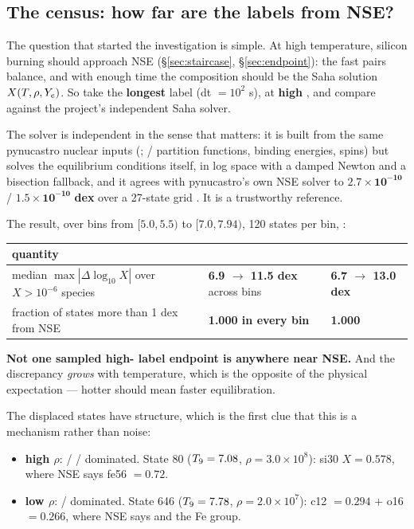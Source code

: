 \subsection{The census: how far are the labels from NSE?}
\label{sec:census}

The question that started the investigation is simple. At high temperature,
silicon burning should approach NSE (\S\ref{sec:staircase},
\S\ref{sec:endpoint}): the fast pairs balance, and with enough time the
composition should be the Saha solution $X(T, \rho, Y_{e})$. So take the
\textbf{longest} label (dt $= 10^{2}$ s), at \textbf{high} \Tn{}, and compare
against the project's independent Saha solver.

The solver is independent in the sense that matters: it is built from the same
pynucastro nuclear inputs (\citealt{smithclark2023}; \citealt{rauscher1997} /
\citealt{rauscher2003} partition functions, binding energies, spins) but solves
the equilibrium conditions itself, in log space with a damped Newton and a
bisection fallback, and it agrees with pynucastro's own NSE solver to
$\mathbf{2.7 \times 10^{-10}}$ / $\mathbf{1.5 \times 10^{-10}}$ \textbf{dex}
over a 27-state grid . It is a trustworthy reference.

The result, over \Tn{} bins from $[5.0, 5.5)$ to $[7.0, 7.94)$, 120 states per
bin, :

\begin{tabularx}{\textwidth}{@{}Y L{4.0cm} L{3.4cm}@{}}
\toprule
\textbf{quantity} & \textbf{} & \textbf{} \\
\midrule
median $\max|\Delta\log_{10}X|$ over $X > 10^{-6}$ species &
  \textbf{6.9 $\to$ 11.5 dex} across bins & \textbf{6.7 $\to$ 13.0 dex} \\
fraction of states more than 1 dex from NSE &
  \textbf{1.000 in every bin} & \textbf{1.000} \\
\bottomrule
\end{tabularx}

\textbf{Not one sampled high-\Tn{} label endpoint is anywhere near NSE.} And
the discrepancy \emph{grows} with temperature, which is the opposite of the
physical expectation --- hotter should mean faster equilibration.

The displaced states have structure, which is the first clue that this is a
mechanism rather than noise:

\begin{itemize}
\item \textbf{high $\rho$}:  /  / 
  dominated. State 80 ($T_{9} = 7.08$, $\rho = 3.0 \times 10^{8}$): si30
  $X = 0.578$, where NSE says fe56 $= 0.72$.
\item \textbf{low $\rho$}:  /  dominated. State 646
  ($T_{9} = 7.78$, $\rho = 2.0 \times 10^{7}$): c12 $= 0.294$ + o16 $= 0.266$,
  where NSE says  and the Fe group.
\end{itemize}

